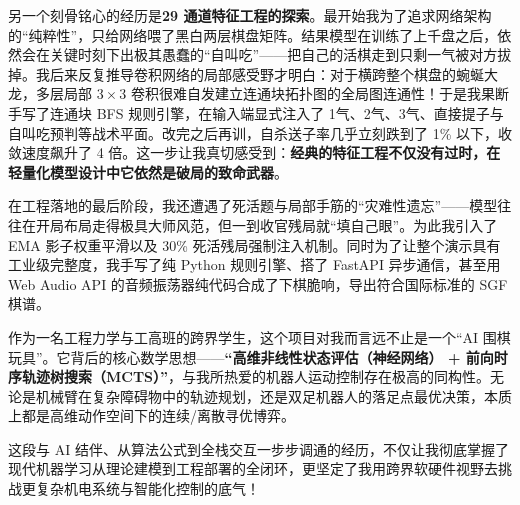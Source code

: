 \documentclass[11pt,a4paper]{ctexart}
\begin{document}
另一个刻骨铭心的经历是\textbf{29 通道特征工程的探索}。最开始我为了追求网络架构的“纯粹性”，只给网络喂了黑白两层棋盘矩阵。结果模型在训练了上千盘之后，依然会在关键时刻下出极其愚蠢的“自叫吃”——把自己的活棋走到只剩一气被对方拔掉。我后来反复推导卷积网络的局部感受野才明白：对于横跨整个棋盘的蜿蜒大龙，多层局部 $3\times3$ 卷积很难自发建立连通块拓扑图的全局图连通性！于是我果断手写了连通块 BFS 规则引擎，在输入端显式注入了 1气、2气、3气、直接提子与自叫吃预判等战术平面。改完之后再训，自杀送子率几乎立刻跌到了 1\% 以下，收敛速度飙升了 4 倍。这一步让我真切感受到：\textbf{经典的特征工程不仅没有过时，在轻量化模型设计中它依然是破局的致命武器}。

在工程落地的最后阶段，我还遭遇了死活题与局部手筋的“灾难性遗忘”——模型往往在开局布局走得极具大师风范，但一到收官残局就“填自己眼”。为此我引入了 EMA 影子权重平滑以及 30\% 死活残局强制注入机制。同时为了让整个演示具有工业级完整度，我手写了纯 Python 规则引擎、搭了 FastAPI 异步通信，甚至用 Web Audio API 的音频振荡器纯代码合成了下棋脆响，导出符合国际标准的 SGF 棋谱。

作为一名工程力学与工高班的跨界学生，这个项目对我而言远不止是一个“AI 围棋玩具”。它背后的核心数学思想——\textbf{“高维非线性状态评估（神经网络） + 前向时序轨迹树搜索（MCTS）”}，与我所热爱的机器人运动控制存在极高的同构性。无论是机械臂在复杂障碍物中的轨迹规划，还是双足机器人的落足点最优决策，本质上都是高维动作空间下的连续/离散寻优博弈。

这段与 AI 结伴、从算法公式到全栈交互一步步调通的经历，不仅让我彻底掌握了现代机器学习从理论建模到工程部署的全闭环，更坚定了我用跨界软硬件视野去挑战更复杂机电系统与智能化控制的底气！
\vspace{12pt}
\hfill\songti 
\end{document}
